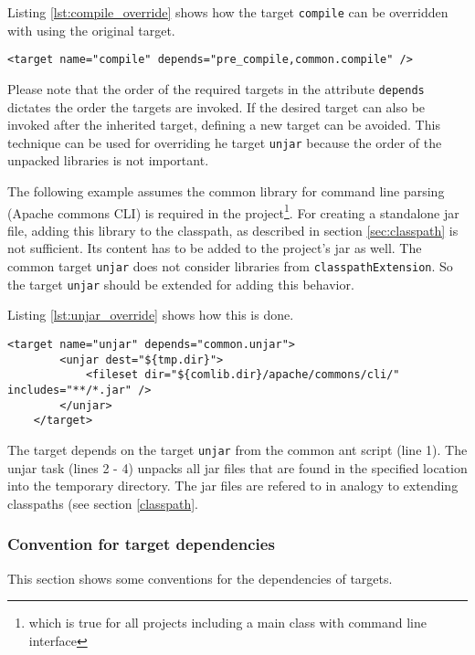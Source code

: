 \documentclass[a4paper,twoside,11pt,bibtotoc]{article}
\begin{document}
Listing \ref{lst:compile_override} shows how the target \texttt{compile} can be overridden with using the original target.

\begin{lstlisting}[caption=Overriding the target \texttt{compile},label=lst:compile_override,float=!ht,language=ant]
	<target name="compile" depends="pre_compile,common.compile" />
\end{lstlisting}

Please note that the order of the required targets in the attribute \texttt{depends} dictates the order the targets are invoked.
If the desired target can also be invoked after the inherited target, defining a new target can be avoided.
This technique can be used for overriding he target \texttt{unjar} because the order of the unpacked libraries is not important.

The following example assumes the common library for command line parsing (Apache commons CLI) is required in the project\footnote{which is true for all projects including a main class with command line interface}.
For creating a standalone jar file, adding this library to the classpath, as described in section \ref{sec:classpath} is not sufficient.
Its content has to be added to the project's jar as well.
The common target \texttt{unjar} does not consider libraries from \texttt{classpathExtension}.
So the target \texttt{unjar} should be extended for adding this behavior.

Listing \ref{lst:unjar_override} shows how this is done.

\begin{lstlisting}[caption=Overriding the target \texttt{unjar},label=lst:unjar_override,float=!ht,language=ant]
	<target name="unjar" depends="common.unjar">
		<unjar dest="${tmp.dir}">
			<fileset dir="${comlib.dir}/apache/commons/cli/" includes="**/*.jar" />
		</unjar>
	</target>
\end{lstlisting}

The target depends on the target \texttt{unjar} from the common ant script (line 1).
The unjar task (lines 2 - 4) unpacks all jar files that are found in the specified location into the temporary directory.
The jar files are refered to in analogy to extending classpaths (see section \ref{classpath}.

\subsubsection{Convention for target dependencies}
\label{sec:target:conventions}
This section shows some conventions for the dependencies of targets.
\end{document}
